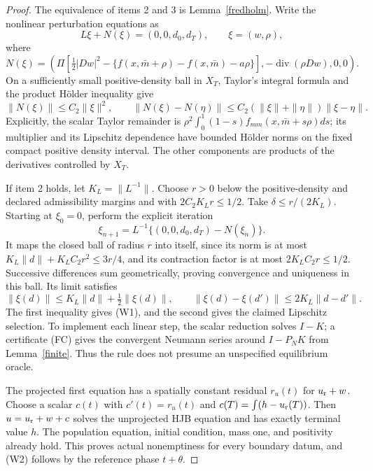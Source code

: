 \documentclass[11pt,a4paper]{article}
\begin{document}
\begin{proof}
The equivalence of items 2 and 3 is Lemma~\ref{fredholm}. Write the
nonlinear perturbation equations as
\[
 L\xi+N(\xi)=(0,0,d_0,d_T),\qquad \xi=(w,\rho),
\]
where
\begin{equation}\tag{N1}\label{N1}
 N(\xi)=\left(\Pi\left[\tfrac12|Dw|^2-
 \{f(x,\bar m+\rho)-f(x,\bar m)-a\rho\}\right],
 -\operatorname{div}(\rho Dw),0,0\right).
\end{equation}
On a sufficiently small positive-density ball in $X_T$, Taylor's
integral formula and the product H\"older inequality give
\begin{equation}\tag{N2}\label{N2}
 \|N(\xi)\|\leq C_2\|\xi\|^2,\qquad
 \|N(\xi)-N(\eta)\|\leq C_2(\|\xi\|+\|\eta\|)\|\xi-\eta\|.
\end{equation}
Explicitly, the scalar Taylor remainder is
$\rho^2\int_0^1(1-s)f_{mm}(x,\bar m+s\rho)ds$; its multiplier
and its Lipschitz dependence have bounded H\"older norms on the fixed
compact positive density interval. The other components are products
of the derivatives controlled by $X_T$.

If item 2 holds, let $K_L=\|L^{-1}\|$. Choose $r>0$ below the
positive-density and declared admissibility margins and with
$2C_2K_Lr\leq1/2$. Take $\delta\leq r/(2K_L)$. Starting at $\xi_0=0$,
perform the explicit iteration
\begin{equation}\tag{SEL}\label{SEL}
 \xi_{n+1}=L^{-1}\{(0,0,d_0,d_T)-N(\xi_n)\}.
\end{equation}
It maps the closed ball of radius $r$ into itself, since its norm
is at most $K_L\|d\|+K_LC_2r^2\leq3r/4$, and its contraction
factor is at most $2K_LC_2r\leq1/2$. Successive differences sum
geometrically, proving convergence and uniqueness in this ball.
Its limit satisfies
\[
 \|\xi(d)\|\leq K_L\|d\|+\tfrac12\|\xi(d)\|,
 \qquad \|\xi(d)-\xi(d')\|\leq2K_L\|d-d'\|.
\]
The first inequality gives (W1), and the second gives the claimed
Lipschitz selection. To implement each linear step, the scalar
reduction solves $I-K$; a certificate (FC) gives the convergent
Neumann series around $I-P_NK$ from Lemma~\ref{finite}. Thus the
rule does not presume an unspecified equilibrium oracle.

The projected first equation has a spatially constant residual
$r_u(t)$ for $u_{\rm r}+w$. Choose a scalar $c(t)$ with
$c'(t)=r_u(t)$ and
$c(T)=\int(h-u_{\rm r}(T))$. Then
$u=u_{\rm r}+w+c$ solves the unprojected HJB equation and has exactly
terminal value $h$. The population equation, initial condition, mass
one, and positivity already hold. This proves actual nonemptiness
for every boundary datum, and (W2) follows by the reference phase
$t+\theta$.


\end{proof}
\end{document}
